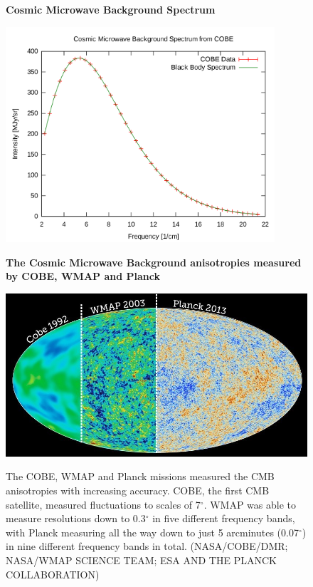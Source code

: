 \documentclass{article}
\begin{document}
\begin{figure}
\centering
    \textbf{Cosmic Microwave Background  Spectrum}\par\medskip
\centering
   {\includegraphics[height=8cm]{blackbody}}
\caption{}
\label{cobe_blackbody}
\end{figure}


\begin{figure}
\centering
    \textbf{The Cosmic Microwave Background anisotropies measured by COBE, WMAP and Planck}\par\medskip
\centering
   {\includegraphics[width=.75\textwidth]{cmb1.jpg}}


\caption{The COBE, WMAP and Planck missions measured the CMB anisotropies with increasing accuracy. COBE, the first CMB satellite, measured fluctuations to scales of 7$^\circ$. WMAP was able to measure resolutions down to 0.3$^\circ$ in five different frequency bands, with Planck measuring all the way down to just 5 arcminutes (0.07$^\circ$) in nine different frequency bands in total.  (NASA/COBE/DMR; NASA/WMAP SCIENCE TEAM; ESA AND THE PLANCK COLLABORATION)}
\label{cobe_wmap_planck}
\end{figure}
\end{document}
